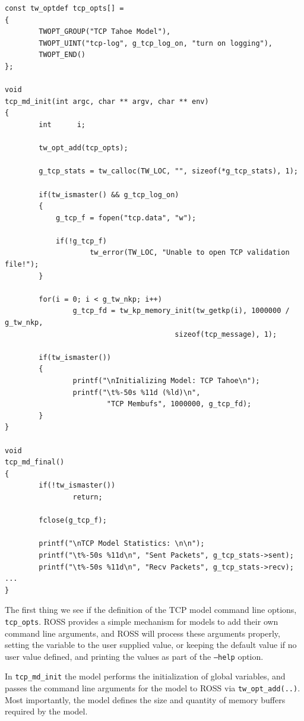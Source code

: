 \documentclass[conference,onecolumn]{IEEEtran}
\begin{document}
\begin{small}\begin{verbatim}
const tw_optdef tcp_opts[] =
{
        TWOPT_GROUP("TCP Tahoe Model"),
        TWOPT_UINT("tcp-log", g_tcp_log_on, "turn on logging"),
        TWOPT_END()
};

void
tcp_md_init(int argc, char ** argv, char ** env)
{
        int      i;

        tw_opt_add(tcp_opts);

        g_tcp_stats = tw_calloc(TW_LOC, "", sizeof(*g_tcp_stats), 1);

        if(tw_ismaster() && g_tcp_log_on)
        {
            g_tcp_f = fopen("tcp.data", "w");

            if(!g_tcp_f)
                    tw_error(TW_LOC, "Unable to open TCP validation file!");
        }
        
        for(i = 0; i < g_tw_nkp; i++)
                g_tcp_fd = tw_kp_memory_init(tw_getkp(i), 1000000 / g_tw_nkp,
                                        sizeof(tcp_message), 1);

        if(tw_ismaster())
        {
                printf("\nInitializing Model: TCP Tahoe\n");
                printf("\t%-50s %11d (%ld)\n",
                        "TCP Membufs", 1000000, g_tcp_fd);
        }
}

void
tcp_md_final()
{
        if(!tw_ismaster())
                return;

        fclose(g_tcp_f);
        
        printf("\nTCP Model Statistics: \n\n");
        printf("\t%-50s %11d\n", "Sent Packets", g_tcp_stats->sent);
        printf("\t%-50s %11d\n", "Recv Packets", g_tcp_stats->recv);
...
}
\end{verbatim}\end{small}
 
The first thing we see if the definition of the TCP model command line options, {\tt tcp\_opts}.  ROSS provides a simple mechanism for models to add their own command line arguments, and ROSS will process these arguments properly, setting the variable to the user supplied value, or keeping the default value if no user value defined, and printing the values as part of the {\tt --help} option.

In {\tt tcp\_md\_init} the model performs the initialization of global variables, and passes the command line arguments for the model to ROSS via {\tt tw\_opt\_add(..)}.  Most importantly, the model defines the size and quantity of memory buffers required by the model.
\end{document}
